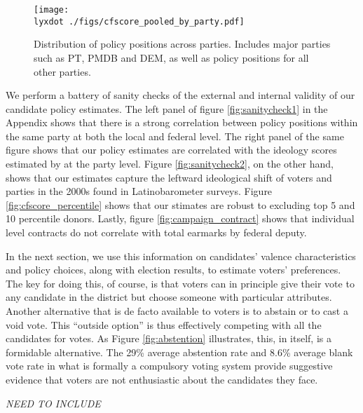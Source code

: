 \documentclass[12pt,english]{article}
\newcommand{\lyxdot}{.}
\numberwithin{equation}{section}
\theoremstyle{plain}
\theoremstyle{remark}
\theoremstyle{plain}
\begin{document}
\begin{figure}[h]
  \centering
  \texttt{[image: \\lyxdot ./figs/cfscore\_pooled\_by\_party.pdf]}
  \caption{Distribution of policy positions across parties. Includes major parties such as PT, PMDB and DEM, as well as policy positions for all other parties.}
  \label{fig:cfscore_hist}
\end{figure} 

We perform a battery of sanity checks of the external and internal validity of our candidate policy estimates.  The left panel of figure \ref{fig:sanitycheck1} in the Appendix shows that there is a strong correlation between policy positions within the same party at both the local and federal level. The right panel of the same figure shows that our policy estimates are correlated with the ideology scores estimated by   at the party level. Figure \ref{fig:sanitycheck2}, on the other hand, shows that our estimates capture the leftward ideological shift of voters and parties in the 2000s found in Latinobarometer surveys. Figure \ref{fig:cfscore_percentile} shows that our stimates are robust to excluding top 5 and 10 percentile donors. Lastly, figure \ref{fig:campaign_contract} shows that individual level contracts do not correlate with total earmarks by federal deputy.%

In the next section, we use this information on candidates' valence characteristics and policy choices, along with election results, to estimate voters' preferences.  The key for doing this, of course, is that voters can in principle give their vote to any candidate in the district but choose someone with particular attributes. Another alternative that is de facto available to voters is to abstain or to cast a void vote. This ``outside option'' is thus effectively competing with all the candidates for votes. As Figure  \ref{fig:abstention} illustrates, this, in itself, is a formidable alternative. The 29\% average abstention rate and 8.6\% average blank vote rate in what is formally a compulsory voting system provide suggestive evidence that voters are not enthusiastic about the candidates they face.

\emph{NEED TO INCLUDE}
\end{document}

